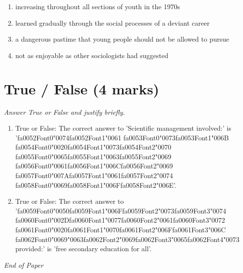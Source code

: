 \documentclass[12pt]{article}
\begin{document}
\begin{enumerate}[label=\arabic*.]
\begin{enumerate}[label=(\alph*)]
    \item increasing throughout all sections of youth in the 1970s
    \item learned gradually through the social processes of a deviant career
    \item a dangerous pastime that young people should not be allowed to pursue
    \item not as enjoyable as other sociologists had suggested
\end{enumerate}
\end{enumerate}

\section*{True / False (4 marks)}
\textit{Answer True or False and justify briefly.}
\begin{enumerate}[label=\arabic*.]
\item True or False: The correct answer to 'Scientific management involved:' is '{\csname fa0052Font0\endcsname\char"0074}{\csname fa0052Font1\endcsname\char"0061} {\csname fa0053Font0\endcsname\char"0073}{\csname fa0053Font1\endcsname\char"006B} {\csname fa0054Font0\endcsname\char"0020}{\csname fa0054Font1\endcsname\char"0073}{\csname fa0054Font2\endcsname\char"0070} {\csname fa0055Font0\endcsname\char"0065}{\csname fa0055Font1\endcsname\char"0063}{\csname fa0055Font2\endcsname\char"0069} {\csname fa0056Font0\endcsname\char"0061}{\csname fa0056Font1\endcsname\char"006C}{\csname fa0056Font2\endcsname\char"0069} {\csname fa0057Font0\endcsname\char"007A}{\csname fa0057Font1\endcsname\char"0061}{\csname fa0057Font2\endcsname\char"0074} {\csname fa0058Font0\endcsname\char"0069}{\csname fa0058Font1\endcsname\char"006F}{\csname fa0058Font2\endcsname\char"006E}'.
\item True or False: The correct answer to '{\csname fa0059Font0\endcsname\char"0050}{\csname fa0059Font1\endcsname\char"006F}{\csname fa0059Font2\endcsname\char"0073}{\csname fa0059Font3\endcsname\char"0074} {\csname fa0060Font0\endcsname\char"002D}{\csname fa0060Font1\endcsname\char"0077}{\csname fa0060Font2\endcsname\char"0061}{\csname fa0060Font3\endcsname\char"0072} {\csname fa0061Font0\endcsname\char"0020}{\csname fa0061Font1\endcsname\char"0070}{\csname fa0061Font2\endcsname\char"006F}{\csname fa0061Font3\endcsname\char"006C} {\csname fa0062Font0\endcsname\char"0069}{\char"0063}{\csname fa0062Font2\endcsname\char"0069}{\csname fa0062Font3\endcsname\char"0065}{\csname fa0062Font4\endcsname\char"0073} provided:' is 'free secondary education for all'.
\end{enumerate}

\vfill
\noindent\textit{End of Paper}
\end{document}
